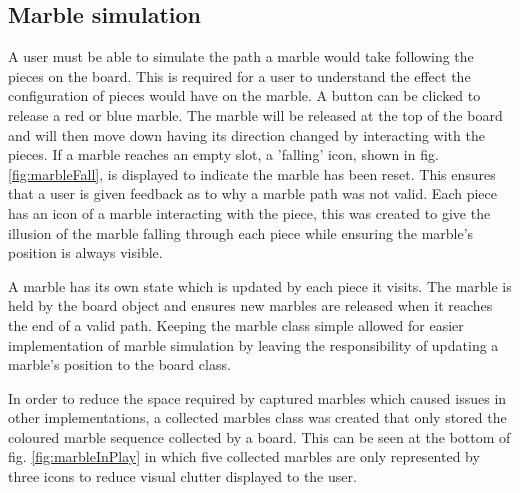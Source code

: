 \documentclass{l4proj}
\begin{document}
\subsection{Marble simulation}
A user must be able to simulate the path a marble would take following the pieces on the board. This is required for a user to understand the effect the configuration of pieces would have on the marble. A button can be clicked to release a red or blue marble. The marble will be released at the top of the board and will then move down having its direction changed by interacting with the pieces. If a marble reaches an empty slot, a 'falling' icon, shown in fig. \ref{fig:marbleFall}, is displayed to indicate the marble has been reset. This ensures that a user is given feedback as to why a marble path was not valid. Each piece has an icon of a marble interacting with the piece, this was created to give the illusion of the marble falling through each piece while ensuring the marble's position is always visible.

A marble has its own state which is updated by each piece it visits. The marble is held by the board object and ensures new marbles are released when it reaches the end of a valid path. Keeping the marble class simple allowed for easier implementation of marble simulation by leaving the responsibility of updating a marble's position to the board class. 


In order to reduce the space required by captured marbles which caused issues in other implementations, a collected marbles class was created that only stored the coloured marble sequence collected by a board. This can be seen at the bottom of fig. \ref{fig:marbleInPlay} in which five collected marbles are only represented by three icons to reduce visual clutter displayed to the user.
\end{document}
